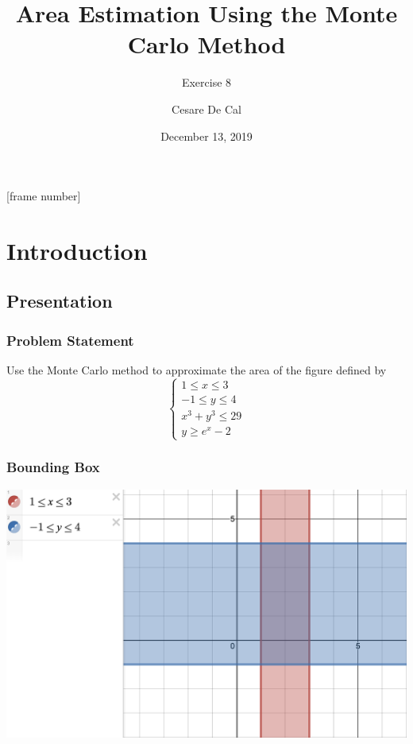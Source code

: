 \documentclass{beamer}
\title{Area Estimation Using the Monte Carlo Method}
\subtitle{Exercise 8}
\author{Cesare De Cal}
\institute{University of Antwerp - Erasmus Exchange}
\date{December 13, 2019}
\begin{document}
[frame number]{}


\begin{frame}
\titlepage
\end{frame}

\section{Introduction}
\subsection{Presentation}
\begin{frame}
\frametitle{Problem Statement}
Use the Monte Carlo method to approximate the area of the figure defined by
$$
\begin{cases}
1 \le x \le 3 \\
-1\le y \le 4 \\  
x^3+y^3\le 29 \\
y \ge e^x -2
\end{cases}$$
\end{frame}

\begin{frame}
\frametitle{Bounding Box}
\includegraphics[width=\textwidth,height=\textheight,keepaspectratio]{bounding_box.png}
\end{frame}
\end{document}
